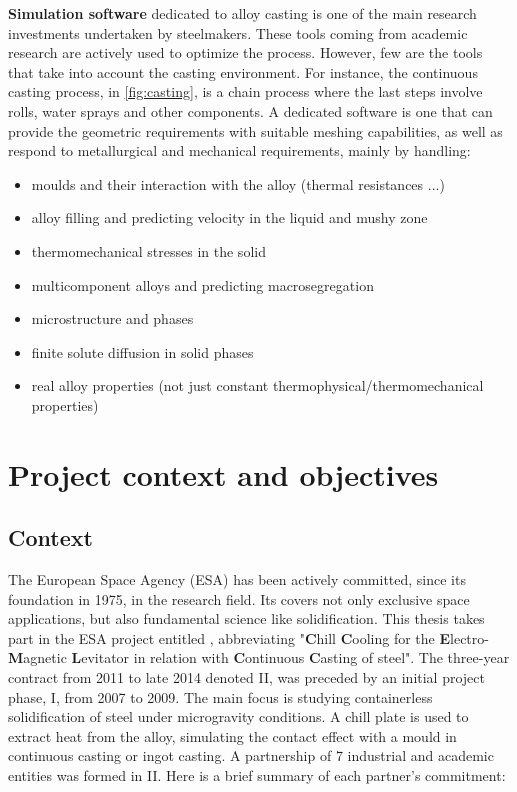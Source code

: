 \textbf{Simulation software} dedicated to alloy casting is one of the main research investments undertaken by steelmakers. These tools coming from academic research
are actively used to optimize the process. However, few are the tools that take into account the casting environment. For instance, the continuous casting process, in
\cref{fig:casting}, is a chain process where the last steps involve rolls, water sprays and other components. A dedicated software is one that can provide the
geometric requirements with suitable meshing capabilities, as well as respond to metallurgical and mechanical requirements, mainly by handling:
\begin{itemize}
\itemsep0em
\item moulds and their interaction with the alloy (thermal resistances ...)
\item alloy filling and predicting velocity in the liquid and mushy zone
\item thermomechanical stresses in the solid
\item multicomponent alloys and predicting macrosegregation
\item microstructure and phases
\item finite solute diffusion in solid phases
\item real alloy properties (not just constant thermophysical/thermomechanical properties)
\end{itemize}
%
%
\section{Project context and objectives}
%
\subsection{Context}
The European Space Agency (ESA) has been actively committed, since its foundation in 1975, in the research field.
Its covers not only exclusive space applications, but also fundamental science like solidification. 
This thesis takes part in the ESA project entitled \ccemlcc, abbreviating
"\textbf{C}hill \textbf{C}ooling for the \textbf{E}lectro-\textbf{M}agnetic \textbf{L}evitator in relation with 
\textbf{C}ontinuous \textbf{C}asting of steel".
The three-year contract from 2011 to late 2014 denoted \ccemlcc II, was preceded by an initial project phase, \ccemlcc I,
from 2007 to 2009. The main focus is studying containerless solidification of steel under microgravity conditions. 
A chill plate is used to extract heat from the alloy, simulating the contact effect with a mould in continuous casting
or ingot casting.
A partnership of 7 industrial and academic entities was formed in \ccemlcc II. 
Here is a brief summary of each partner's commitment:\\

